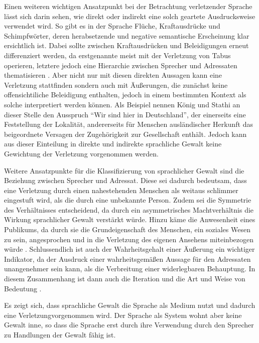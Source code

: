 Einen weiteren wichtigen Ansatzpunkt bei der Betrachtung verletzender Sprache lässt sich darin sehen, wie direkt oder indirekt eine solch geartete Ausdrucksweise verwendet wird.
So gibt es in der Sprache Flüche, Kraftausdrücke und Schimpfwörter, deren herabsetzende und negative semantische Erscheinung klar ersichtlich ist.
Dabei sollte zwischen Kraftausdrücken und Beleidigungen erneut differenziert werden, da erstgenannte meist mit der Verletzung von Tabus operieren, letztere jedoch eine Hierarchie zwischen Sprecher und Adressaten thematisieren \cite[S. 53]{EK10}.
Aber nicht nur mit diesen direkten Aussagen kann eine Verletzung stattfinden sondern auch mit Äußerungen, die zunächst keine offensichtiliche Beleidigung enthalten, jedoch in einem bestimmten Kontext als solche interpretiert werden können.
Als Beispiel nennen König und Stathi an dieser Stelle den Ausspruch "`Wir sind hier in Deutschland"', der einerseits eine Feststellung der Lokalität, andererseits für Menschen ausländischer Herkunft das beigeordnete Versagen der Zugehörigkeit zur Gesellschaft enthält.
Jedoch kann aus dieser Einteilung in direkte und indirekte sprachliche Gewalt keine Gewichtung der Verletzung vorgenommen werden.

Weitere Ansatzpunkte für die Klassifizierung von sprachlicher Gewalt sind die Beziehung zwischen Sprecher und Adressat.
Diese sei dadurch bedeutsam, dass eine Verletzung durch einen nahestehenden Menschen als weitaus schlimmer eingestuft wird, als die durch eine unbekannte Person.
Zudem sei die Symmetrie des Verhältnisses entscheidend, da durch ein asymmetrisches Machtverhältnis die Wirkung sprachlicher Gewalt verstärkt würde.
Hinzu käme die Anwesenheit eines Publikums, da durch sie die Grundeigenschaft des Menschen, ein soziales Wesen zu sein, angesprochen und in die Verletzung des eigenen Ansehens miteinbezogen würde \cite[S. 56]{EK10}.
Schlussendlich ist auch der Wahrheitsgehalt einer Äußerung ein wichtiger Indikator, da der Ausdruck einer wahrheitsgemäßen Aussage für den Adressaten unangenehmer sein kann, als die Verbreitung einer widerlegbaren Behauptung.
In diesem Zusammenhang ist dann auch die Iteration und die Art und Weise von Bedeutung \cite[S. 58]{EK10}.

Es zeigt sich, dass sprachliche Gewalt die Sprache als Medium nutzt und dadurch eine Verletzungvorgenommen wird. Der Sprache als System wohnt aber keine Gewalt inne, so dass die Sprache erst durch ihre Verwendung durch den Sprecher zu Handlungen der Gewalt fähig ist.


